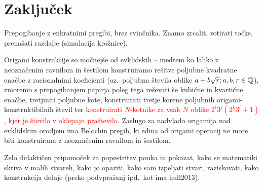 \section{Zaključek}

Prepogibanje z enkratnimi pregibi, brez svinčnika. Znamo zrcalit, rotirati točke, prenašati razdalje (simulacija krožnice).

Origami konstrukcije so močnejše od evklidskih -- medtem ko lahko z neoznačenim ravnilom in šestilom konstruiramo rešitve poljubne kvadratne enačbe z racionalnimi koeficienti (oz.\ poljubna števila oblike $a + b\sqrt{r}; a,b,r \in \mathbb Q$), zmoremo s prepogibanjem papirja poleg tega reševati še kubične in kvartične enačbe, tretjiniti poljubne kote, konstruirati tretje korene poljubnih origami-konstruktibilnih števil ter \textcolor{red}{konstruirati $N$-kotnike za vsak $N$ oblike $2^i 3^j (2^k 3^l+1)$, kjer je število v oklepaju praštevilo}. Zaslugo za nadvlado origamija nad evklidskim orodjem ima Belochin pregib, ki edina od origami operacij ne more biti konstruirana z neoznačenim ravnilom in šestilom.

Zelo didaktičen pripomoček za popestritev pouka in pokazat, kako se matematiki skriva v malih stvareh, kako jo opaziti, kako sam izpeljati stvari, raziskovati, kako konstrukcija deluje (preko podvprašanj ipd.\ kot ima hull2013).